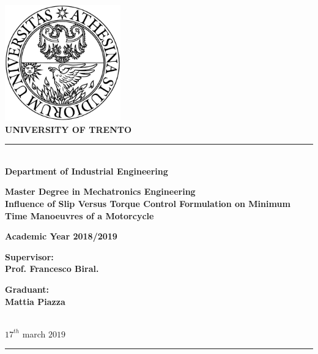 \begin{titlepage}
\begin{center}
\includegraphics[width=5cm]{img/logo.png}\\[1cm]
{\Huge \bfseries UNIVERSITY OF TRENTO\\[1cm]}


\rule{\linewidth}{0.3mm} \\[1cm]

{\huge \bfseries Department of Industrial Engineering\\[1cm]}

{\LARGE \bfseries  Master Degree in Mechatronics Engineering\\[1.5cm]}
%
{ \Large \bfseries  Influence of Slip Versus Torque Control Formulation on Minimum Time Manoeuvres of a Motorcycle \\[1cm] }

{ \large \bfseries  Academic Year 2018/2019 \\[2cm] }

\end{center}


\begin{minipage}{0.5\linewidth}
    \Large \bfseries
    Supervisor:\\
    Prof. Francesco Biral.
\end{minipage}%
\begin{minipage}{0.5\linewidth}
\begin{flushright}
    \Large \bfseries
    Graduant:\\
    Mattia Piazza  
\end{flushright}
\end{minipage}
\\[0.5cm]


\vfill
$17^{th}$ march $2019$ \\
\rule{\linewidth}{0.3mm} \\[0.5cm]
\end{titlepage}
%


